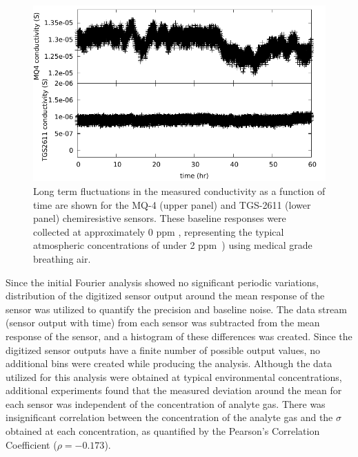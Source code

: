 \documentclass[sensors,article,submit,moreauthors,pdftex]{Definitions/mdpi}
\begin{document}
			
			\begin{figure}[!t]
				\centering
				\includegraphics[width=\columnwidth]{honey5.pdf}
				\caption{%
					Long term fluctuations in the measured conductivity as a function of time are shown for the MQ-4 (upper panel) and TGS-2611 (lower panel) chemiresistive sensors.  These baseline responses were collected at approximately 0 ppm , representing the typical atmospheric concentrations of under 2 ppm~\cite{turner_large_2016,bamberger_spatial_2014,dlugokencky_trends_2016-1}) using medical grade breathing air.
				}
				\label{fig:MQ4TGSbaseline}
			\end{figure}
			
			Since the initial Fourier analysis showed no significant periodic variations, distribution of the digitized sensor output around the mean response of the sensor was utilized to quantify the precision and baseline noise.
			The data stream (sensor output with time) from each sensor was subtracted from the mean response of the sensor, and a histogram of these differences was created.
			Since the digitized sensor outputs have a finite number of possible output values, no additional bins were created while producing the analysis.
			Although the data utilized for this analysis were obtained at typical environmental concentrations, additional experiments found that the measured deviation around the mean for each sensor was independent of the concentration of analyte gas.
			There was insignificant correlation between the concentration of the analyte gas and the $\sigma$ obtained at each concentration, as quantified by the Pearson's Correlation Coefficient ($\rho=-0.173$).
			
\end{document}
